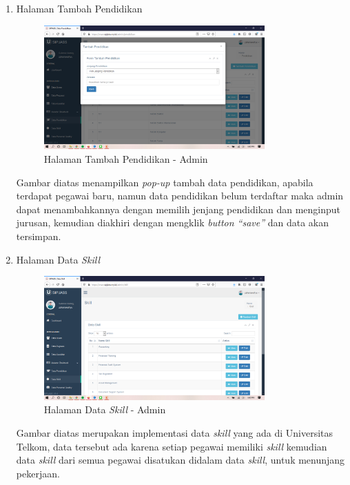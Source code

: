 \begin{enumerate}
	\item Halaman Tambah Pendidikan
	\begin{figure}
		\centering
		\includegraphics[width=0.8\textwidth]
		{pics/admin/implementasi/tambahpendidikan.png}
		\caption{Halaman Tambah Pendidikan - Admin}
		\label{fig:CC10}
	\end{figure}
	Gambar diatas menampilkan \textit{pop-up} tambah data pendidikan, apabila terdapat pegawai baru, namun data pendidikan belum terdaftar maka admin dapat menambahkannya dengan memilih jenjang pendidikan dan menginput jurusan,  kemudian diakhiri dengan mengklik \textit{button “save”} dan data akan tersimpan.
	
	\item Halaman Data \textit{Skill}
	\begin{figure}
		\centering
		\includegraphics[width=0.8\textwidth]
		{pics/admin/implementasi/dataskill.png}
		\caption{Halaman Data \textit{Skill} - Admin}
		\label{fig:CC10}
	\end{figure}
	Gambar diatas merupakan implementasi data \textit{skill} yang ada di Universitas Telkom, data tersebut ada karena setiap pegawai memiliki \textit{skill} kemudian data \textit{skill} dari semua pegawai disatukan didalam data \textit{skill},  untuk menunjang pekerjaan. 
	

\end{enumerate}
